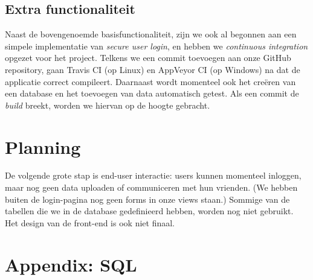 \documentclass[12pt,a4paper]{article}
\begin{document}
\subsection{Extra functionaliteit}

Naast de bovengenoemde basisfunctionaliteit, zijn we ook al begonnen aan een 
simpele implementatie van \emph{secure user login}, en hebben we 
\emph{continuous integration} opgezet voor het project. Telkens we een {commit} 
toevoegen aan onze GitHub {repository}, gaan Travis CI (op Linux) en AppVeyor 
CI (op Windows) na dat de applicatie correct compileert. Daarnaast wordt 
momenteel ook het cre\"eren van een database en het toevoegen van data 
automatisch getest. Als een commit de \textit{build} breekt, worden we hiervan 
op de hoogte gebracht.

\section{Planning}
De volgende grote stap is end-user interactie: users kunnen momenteel inloggen, 
maar nog geen data uploaden of communiceren met hun vrienden.
(We hebben buiten de login-pagina nog geen forms in onze views staan.)
Sommige van de tabellen die we in de database gedefinieerd hebben, worden nog 
niet gebruikt. Het design van de front-end is ook niet finaal.

\section{Appendix: SQL}
\lstset{language=SQL,basicstyle=\ttfamily}

\end{document}
